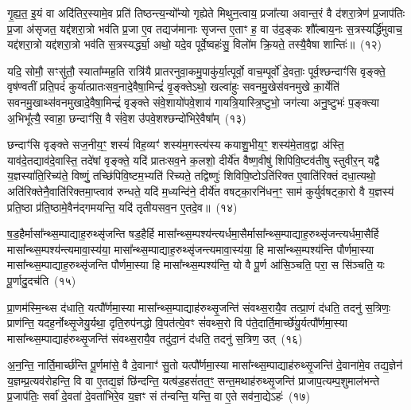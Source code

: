 {%
गृ॒ह्य॒त॒ इ॒यं वा अदि॑तिर॒स्यामे॒व प्रति॑ तिष्ठन्त्य॒न्यो᳚न्यो गृह्येते मिथुन॒त्वाय॒ प्रजा᳚त्या अवान्त॒रं वै द॑शरा॒त्रेण॑ प्र॒जा\-प॑तिः प्र॒जा अ॑सृजत॒ यद्द॑शरा॒त्रो भव॑ति प्र॒जा ए॒व तद्यज॑मानाः सृजन्त ए॒ताꣳ ह॒ वा उ॑द॒ङ्कः शौ᳚ल्बाय॒नः स॒त्रस्यर्द्धि॑मुवाच॒ यद्द॑शरा॒त्रो यद्द॑शरा॒त्रो भव॑ति स॒त्रस्यर्द्ध्या॒ अथो॒ यदे॒व पूर्वे॒ष्वहः॑सु॒ विलो॑म क्रि॒यते॒ तस्यै॒वैषा शान्तिः॑॥~(१२)

{\anuvakamend[{आ॒दि॒त्यस्तस्यै॒व द्वे च॑}]}%

यदि॒ सोमौ॒ सꣳसु॑तौ॒ स्याता᳚म्मह॒ति रात्रि॑यै प्रातरनुवा॒कमु॒पाकु॑र्या॒त्पूर्वो॒ वाच॒म्पूर्वो॑ दे॒वताः॒ पूर्व॒श्छन्दाꣳ॑सि वृङ्क्ते॒ वृष॑ण्वतीं प्रति॒पदं॑ कुर्यात्प्रातःसव॒नादे॒वैषा॒मिन्द्रं॑ वृ॒ङ्क्ते\-ऽथो॒ खल्वा॑हुः सवनमु॒खेस॑वनमुखे का॒र्येति॑ सवनमु॒खाथ्स॑वनमुखादे॒वैषा॒मिन्द्रं॑ वृङ्क्ते संवे॒शायो॑पवे॒शाय॑ गायत्रि॒यास्त्रि॒ष्टुभो॒ जग॑त्या अनु॒ष्टुभः॑ प॒ङ्क्त्या अ॒भिभू᳚त्यै॒ स्वाहा॒ छन्दाꣳ॑सि॒ वै सं॑वे॒श उ॑पवे॒शश्छन्दो॑भिरे॒वैषा᳚म्~(१३)

छन्दाꣳ॑सि वृङ्क्ते सज॒नीय॒ꣳ॒ शस्यं॑ विह॒व्यꣳ॑ शस्य॑म॒गस्त्य॑स्य कयाशु॒भीय॒ꣳ॒ शस्य॑मे॒ताव॒द्वा अ॑स्ति॒ याव॑दे॒तद्याव॑दे॒वास्ति॒ तदे॑षां वृङ्क्ते॒ यदि॑ प्रातःसव॒ने क॒लशो॒ दीर्ये॑त वैष्ण॒वीषु॑ शिपिवि॒ष्टव॑तीषु स्तुवीर॒न् यद्वै य॒ज्ञस्या॑ति॒रिच्य॑ते॒ विष्णुं॒ तच्छि॑पिवि॒ष्टम॒भ्यति॑ रिच्यते॒ तद्विष्णुः॑ शिविपि॒ष्टो\-ऽति॑रिक्त ए॒वाति॑रिक्तं दधा॒त्यथो॒ अति॑रिक्तेनै॒वाति॑रिक्तमा॒प्त्वाव॑ रुन्धते॒ यदि॑ म॒ध्यन्दि॑ने॒ दीर्ये॑त वषट्का॒रनि॑धन॒ꣳ॒ साम॑ कुर्युर्वषट्का॒रो वै य॒ज्ञस्य॑ प्रति॒ष्ठा प्र॑ति॒ष्ठामे॒वैन॑द्गमयन्ति॒ यदि॑ तृतीयसव॒न ए॒तदे॒व॥~(१४)


{\anuvakamend[{छन्दो॑भिरे॒वैषा॒मवैका॒न्नविꣳ॑श॒तिश्च॑}]}%

ष॒ड॒हैर्मासा᳚न्थ्स॒म्पाद्याह॒रुथ्सृ॑जन्ति षड॒हैर्\mbox{}हि मासा᳚न्थ्स॒म्पश्य॑न्त्यर्धमा॒सैर्मासा᳚न्थ्स॒म्पाद्याह॒रुथ्सृ॑जन्त्यर्धमा॒सैर्\mbox{}हि मासा᳚न्थ्स॒म्पश्य॑न्त्यमावा॒स्य॑या॒ मासा᳚न्थ्स॒म्पाद्याह॒रुथ्सृ॑जन्त्यमावा॒स्य॑या॒ हि मासा᳚न्थ्स॒म्पश्य॑न्ति पौर्णमा॒स्या मासा᳚न्थ्स॒म्पाद्याह॒रुथ्सृ॑जन्ति पौर्णमा॒स्या हि मासा᳚न्थ्स॒म्पश्य॑न्ति॒ यो वै पू॒र्ण आ॑सि॒ञ्चति॒ परा॒ स सि॑ञ्चति॒ यः पू॒र्णादु॒दच॑ति~(१५)

प्रा॒णम॑स्मि॒न्थ्स द॑धाति॒ यत्पौ᳚र्णमा॒स्या मासा᳚न्थ्स॒म्पाद्याह॑रुथ्सृ॒जन्ति॑ संवथ्स॒रायै॒व तत्प्रा॒णं द॑धति॒ तदनु॑ स॒त्रिणः॒ प्राण॑न्ति॒ यदह॒र्नोथ्सृ॒जेयु॒र्यथा॒ दृति॒रुप॑नद्धो वि॒पत॑त्ये॒वꣳ सं॑वथ्स॒रो वि प॑ते॒दार्ति॒मार्च्छे॑यु॒र्यत्पौ᳚र्णमा॒स्या मासा᳚न्थ्स॒म्पाद्याह॑रुथ्सृ॒जन्ति॑ संवथ्स॒रायै॒व तदु॑दा॒नं द॑धति॒ तदनु॑ स॒त्रिण॒ उत्~(१६)

अ॒न॒न्ति॒ नार्ति॒मार्च्छ॑न्ति पू॒र्णमा॑से॒ वै दे॒वानाꣳ॑ सु॒तो यत्पौ᳚र्णमा॒स्या मासा᳚न्थ्स॒म्पाद्याह॑रुथ्सृ॒जन्ति॑ दे॒वाना॑मे॒व तद्य॒ज्ञेन॑ य॒ज्ञम्प्र॒त्यव॑रोहन्ति॒ वि वा ए॒तद्य॒ज्ञं छि॑न्दन्ति॒ यत्ष॑ड॒हसं॑तत॒ꣳ॒ सन्त॒मथाह॑रुथ्सृ॒जन्ति॑ प्राजाप॒त्यम्प॒शुमाल॑भन्ते प्र॒जा\-प॑तिः॒ सर्वा॑ दे॒वता॑ दे॒वता॑भिरे॒व य॒ज्ञꣳ सं त॑न्वन्ति॒ यन्ति॒ वा ए॒ते सव॑ना॒द्ये\-ऽहः॑~(१७)

}
